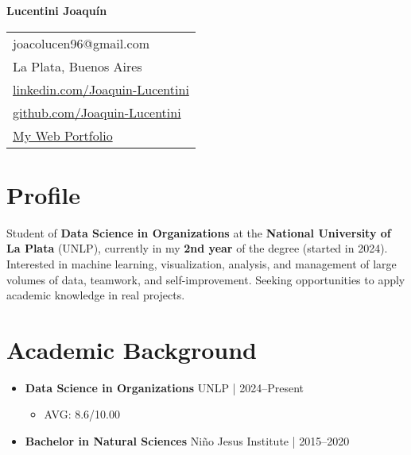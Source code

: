 \documentclass[11pt, a4paper]{article}
\newcommand{\cvitem}[2]{\textbf{#1} \hfill \color{secondary}#2} %
\begin{document}
\begin{center}
    {\Huge \textbf{Lucentini Joaquín}} \\[15pt]
    
    \noindent
    \begin{tabular}{@{} l @{}}
    \faEnvelope{} joacolucen96@gmail.com \\
    \faMapMarker{} La Plata, Buenos Aires \\
    \faLinkedin{} \href{https://www.linkedin.com/in/joaquin-lucentini-a48066277/}{linkedin.com/Joaquin-Lucentini} \\
    \faGithub{} \href{https://github.com/JoacoLucen}{github.com/Joaquin-Lucentini}\\
    \faGlobe{} \href{https://joacolucen.github.io/Joaquin-Lucentini-Portfolio/}{My Web Portfolio}
    \end{tabular}
\end{center}

\section*{Profile}
Student of \textbf{Data Science in Organizations} at the \textbf{National University of La Plata} (UNLP), currently in my \textbf{2nd year} of the degree (started in 2024). Interested in machine learning, visualization, analysis, and management of large volumes of data, teamwork, and self-improvement. Seeking opportunities to apply academic knowledge in real projects.

\section*{Academic Background}
\begin{itemize}[leftmargin=*]
    \item \cvitem{Data Science in Organizations}{UNLP | 2024--Present}
    \begin{itemize}
        \item AVG: 8.6/10.00
    \end{itemize}
    \item \cvitem{Bachelor in Natural Sciences}{Niño Jesus Institute | 2015--2020}
\end{itemize}

\end{document}
